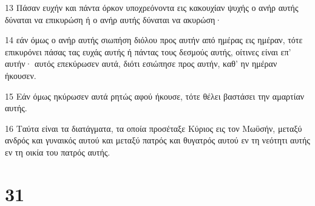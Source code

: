\par 13 Πάσαν ευχήν και πάντα όρκον υποχρεόνοντα εις κακουχίαν ψυχής ο ανήρ αυτής δύναται να επικυρώση ή ο ανήρ αυτής δύναται να ακυρώση·
\par 14 εάν όμως ο ανήρ αυτής σιωπήση διόλου προς αυτήν από ημέρας εις ημέραν, τότε επικυρόνει πάσας τας ευχάς αυτής ή πάντας τους δεσμούς αυτής, οίτινες είναι επ' αυτήν· αυτός επεκύρωσεν αυτά, διότι εσιώπησε προς αυτήν, καθ' ην ημέραν ήκουσεν.
\par 15 Εάν όμως ηκύρωσεν αυτά ρητώς αφού ήκουσε, τότε θέλει βαστάσει την αμαρτίαν αυτής.
\par 16 Ταύτα είναι τα διατάγματα, τα οποία προσέταξε Κύριος εις τον Μωϋσήν, μεταξύ ανδρός και γυναικός αυτού και μεταξύ πατρός και θυγατρός αυτού εν τη νεότητι αυτής εν τη οικία του πατρός αυτής.

\chapter{31}


